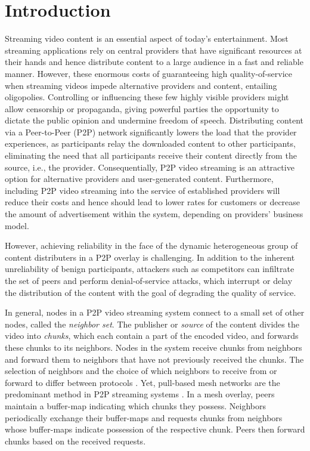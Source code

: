 \section{Introduction}
\label{sec:intro}

Streaming video content is an essential aspect of today's entertainment. Most streaming applications rely on central providers that have significant resources at their hands and hence distribute content to a large audience in a fast and reliable manner. 
However, these enormous costs of guaranteeing high quality-of-service when streaming videos impede alternative providers and content, entailing oligopolies. Controlling or influencing these few highly visible providers might allow censorship or propaganda, giving powerful parties the opportunity  to dictate the public opinion and undermine freedom of speech.   
Distributing content via a Peer-to-Peer (P2P) network significantly lowers the load that the provider experiences, as participants relay the downloaded content to other participants, eliminating the need that all participants receive their content directly from the source, i.e., the provider. 
Consequentially, P2P video streaming is an attractive option for alternative providers and user-generated content. Furthermore, including 
P2P video streaming into the service of established providers will reduce their costs and hence should lead to lower rates for customers or decrease the amount of advertisement within the system, depending on providers' business model. 


However, achieving reliability in the face of the dynamic heterogeneous group of content distributers in a P2P overlay is challenging. In addition to the inherent unreliability of benign participants, attackers such as competitors can infiltrate the set of peers and perform denial-of-service attacks, which interrupt or delay the distribution of the content with the goal of degrading the quality of service. 

In general, nodes in a P2P video streaming system connect to a small set of other nodes, called the \emph{neighbor set}. 
The publisher or \emph{source} of the content divides the video into \emph{chunks}, which each contain a part of the encoded video, and forwards these chunks to its neighbors. Nodes in the system receive chunks from neighbors and forward them to neighbors that have not previously received the chunks. 
The selection of neighbors and the choice of which neighbors to receive from or forward to differ between protocols \cite{sasi2014survey}.  Yet, pull-based mesh networks are the predominant method in P2P streaming systems \cite{zhang2014modeling}. In a mesh overlay, peers maintain a buffer-map indicating which chunks they possess.  Neighbors periodically exchange their buffer-maps and requests chunks from neighbors whose buffer-maps indicate possession of the respective chunk. Peers then forward chunks based on the received requests. 

